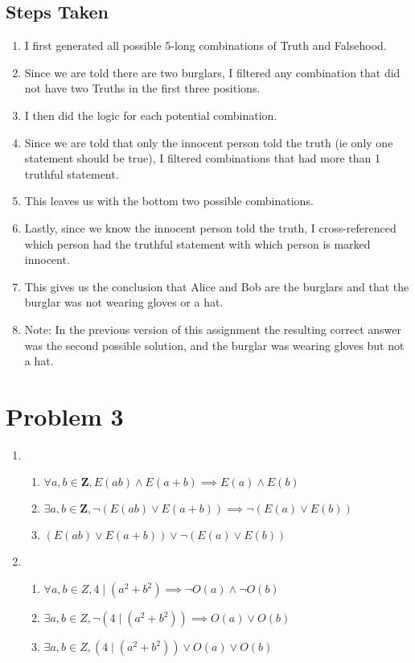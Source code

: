 \documentclass{article}
\begin{document}
\begin{landscape}
    \subsection*{Steps Taken}
    \begin{enumerate}[label=\arabic*.]
        \item I first generated all possible 5-long combinations of Truth and Falsehood.
        \item Since we are told there are two burglars, I filtered any combination that did not have two Truths in the first three positions.
        \item I then did the logic for each potential combination.
        \item Since we are told that only the innocent person told the truth (ie only one statement should be true), I filtered combinations that had more than 1 truthful statement.
        \item This leaves us with the bottom two possible combinations.
        \item Lastly, since we know the innocent person told the truth, I cross-referenced which person had the truthful statement with which person is marked innocent.
        \item This gives us the conclusion that Alice and Bob are the burglars and that the burglar was not wearing gloves or a hat.
        \item Note: In the previous version of this assignment the resulting correct answer was the second possible solution, and the burglar was wearing gloves but not a hat.
    \end{enumerate}
\end{landscape}

\pagebreak

\section*{Problem 3}
\begin{enumerate}[label=\arabic*)]
    \item \begin{enumerate}
        \item \(\forall a,b \in \mathbf{Z}, E(ab) \land E(a+b) \implies E(a) \land E(b)\)
        \item \(\exists a,b \in \mathbf{Z}, \neg (E(ab) \lor E(a+b)) \implies \neg (E(a) \lor E(b))\)
        \item \((E(ab) \lor E(a+b)) \lor \neg (E(a) \lor E(b))\)
    \end{enumerate}
    \item \begin{enumerate}
        \item \(\forall a,b \in Z, 4 \mid (a^2 + b^2) \implies \neg O(a) \land \neg O(b)\)
        \item \(\exists a,b \in Z, \neg(4 \mid (a^2 + b^2)) \implies O(a) \lor O(b)\)
        \item \(\exists a,b \in Z, (4 \mid (a^2 + b^2)) \lor O(a) \lor O(b)\)
    \end{enumerate}
\end{enumerate}
\end{document}
